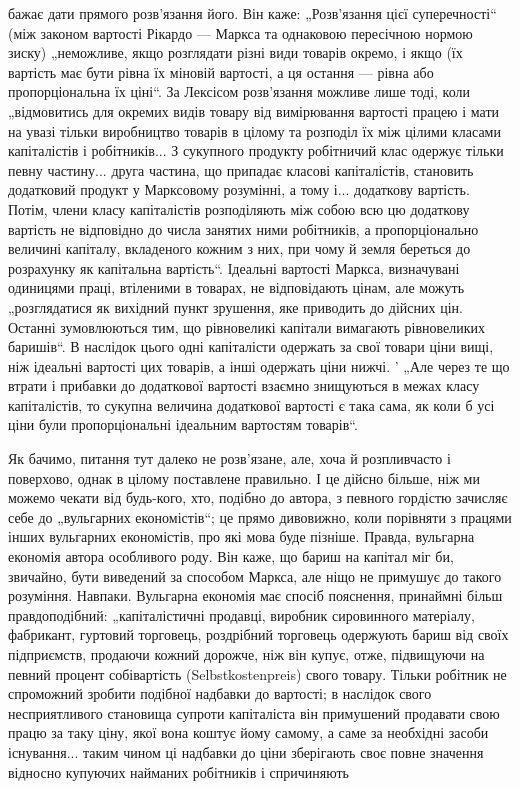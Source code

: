 бажає дати прямого розв’язання його. Він каже: „Розв’язання
цієї суперечності“ (між законом вартості Рікардо — Маркса та однаковою
пересічною нормою зиску) „неможливе, якщо розглядати
різні види товарів окремо, і якщо (їх вартість має бути
рівна їх міновій вартості, а ця остання — рівна або пропорціональна
їх ціні“. За Лексісом розв’язання можливе лише тоді,
коли „відмовитись для окремих видів товару від вимірювання
вартості працею і мати на увазі тільки виробництво товарів
в цілому та розподіл їх між цілими класами капіталістів і робітників...
З сукупного продукту робітничий клас одержує тільки
певну частину... друга частина, що припадає класові капіталістів,
становить додатковий продукт у Марксовому розумінні, а тому і...
додаткову вартість. Потім, члени класу капіталістів розподіляють
між собою всю цю додаткову вартість не відповідно до числа
занятих ними робітників, а пропорціонально величині капіталу,
вкладеного кожним з них, при чому й земля береться до розрахунку
як капітальна вартість“. Ідеальні вартості Маркса, визначувані
одиницями праці, втіленими в товарах, не відповідають
цінам, але можуть „розглядатися як вихідний пункт зрушення,
яке приводить до дійсних цін. Останні зумовлюються тим, що
рівновеликі капітали вимагають рівновеликих баришів“. В наслідок
цього одні капіталісти одержать за свої товари ціни вищі,
ніж ідеальні вартості цих товарів, а інші одержать ціни нижчі. '
„Але через те що втрати і прибавки до додаткової вартості
взаємно знищуються в межах класу капіталістів, то сукупна
величина додаткової вартості є така сама, як коли б усі ціни
були пропорціональні ідеальним вартостям товарів“.

Як бачимо, питання тут далеко не розв’язане, але, хоча й
розпливчасто і поверхово, однак в цілому поставлене правильно.
І це дійсно більше, ніж ми можемо чекати від будь-кого,
хто, подібно до автора, з певного гордістю зачисляє себе
до „вульгарних економістів“; це прямо дивовижно, коли порівняти
з працями інших вульгарних економістів, про які мова буде
пізніше. Правда, вульгарна економія автора особливого роду.
Він каже, що бариш на капітал міг би, звичайно, бути виведений
за способом Маркса, але ніщо не примушує до такого розуміння.
Навпаки. Вульгарна економія має спосіб пояснення, принаймні
більш правдоподібний: „капіталістичні продавці, виробник
сировинного матеріалу, фабрикант, гуртовий торговець,
роздрібний торговець одержують бариш від своїх підприємств,
продаючи кожний дорожче, ніж він купує, отже, підвищуючи
на певний процент собівартість (Selbstkostenpreis) свого товару.
Тільки робітник не спроможний зробити подібної надбавки до
вартості; в наслідок свого несприятливого становища супроти
капіталіста він примушений продавати свою працю за таку ціну,
якої вона коштує йому самому, а саме за необхідні засоби існування...
таким чином ці надбавки до ціни зберігають своє повне
значення відносно купуючих найманих робітників і спричиняють
